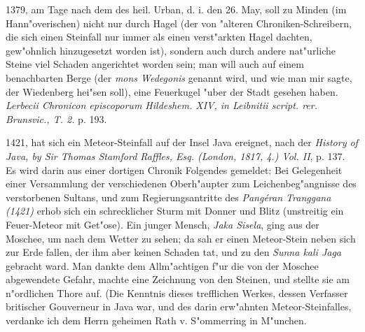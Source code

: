 \documentclass[a4paper, 11pt, oneside, polutonikogreek, german]{article}
\begin{document}
1379, am Tage nach dem des heil. Urban, d. i. den 26. May, soll zu Minden (im Hann"overischen) nicht nur durch Hagel (der von "alteren Chroniken-Schreibern, die sich einen Steinfall nur immer als einen verst"arkten Hagel dachten, gew"ohnlich hinzugesetzt worden ist), sondern auch durch andere nat"urliche Steine viel Schaden angerichtet worden sein; man will auch auf einem benachbarten Berge (der \emph{mons Wedegonis} genannt wird, und wie man mir sagte, der Wiedenberg hei"sen soll), eine Feuerkugel "uber der Stadt gesehen haben. \emph{Lerbecii Chronicon episcoporum Hildeshem. XIV, in Leibnitii script. rer. Brunsvic., T. 2.} p. 193.

1421, hat sich ein Meteor-Steinfall auf der Insel Java ereignet, nach der \emph{History of Java, by Sir Thomas Stamford Raffles, Esq. (London, 1817, 4.) Vol. II}, p. 137. Es wird darin aus einer dortigen Chronik Folgendes gemeldet: Bei Gelegenheit einer Versammlung der verschiedenen Oberh"aupter zum Leichenbeg"angnisse des verstorbenen Sultans, und zum Regierungsantritte des \emph{Pangéran Tranggana (1421)} erhob sich ein schrecklicher Sturm mit Donner und Blitz (unstreitig ein Feuer-Meteor mit Get"ose). Ein junger Mensch, \emph{Jaka Sisela}, ging aus der Moschee, um nach dem Wetter zu sehen; da sah er einen Meteor-Stein neben sich zur Erde fallen, der ihm aber keinen Schaden tat, und zu den \emph{Sunna kali Jaga} gebracht ward. Man dankte dem Allm"achtigen f"ur die von der Moschee abgewendete Gefahr, machte eine Zeichnung von den Steinen, und stellte sie am n"ordlichen Thore auf. (Die Kenntnis dieses trefflichen Werkes, dessen Verfasser britischer Gouverneur in Java war, und des darin erw"ahnten Meteor-Steinfalles, verdanke ich dem Herrn geheimen Rath v. S"ommerring in M"unchen.
\end{document}
